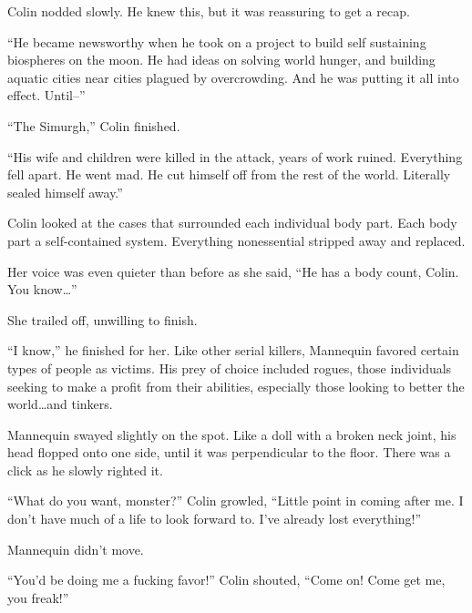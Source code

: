 Colin nodded slowly.  He knew this, but it was reassuring to get a recap.



``He became newsworthy when he took on a project to build self sustaining biospheres on the moon.  He had ideas on solving world hunger, and building aquatic cities near cities plagued by overcrowding.  And he was putting it all into effect.  Until--''



``The Simurgh,'' Colin finished.



``His wife and children were killed in the attack, years of work ruined.  Everything fell apart.  He went mad.  He cut himself off from the rest of the world.  Literally sealed himself away.''



Colin looked at the cases that surrounded each individual body part.  Each body part a self-contained system.  Everything nonessential stripped away and replaced.



Her voice was even quieter than before as she said, ``He has a body count, Colin.  You know\ldots''



She trailed off, unwilling to finish.



``I know,'' he finished for her.  Like other serial killers, Mannequin favored certain types of people as victims.  His prey of choice included rogues, those individuals seeking to make a profit from their abilities, especially those looking to better the world\ldots and tinkers.



Mannequin swayed slightly on the spot.  Like a doll with a broken neck joint, his head flopped onto one side, until it was perpendicular to the floor.  There was a click as he slowly righted it.



``What do you want, monster?''  Colin growled, ``Little point in coming after me.  I don't have much of a life to look forward to.  I've already lost everything!''



Mannequin didn't move.



``You'd be doing me a fucking favor!'' Colin shouted, ``Come on!  Come get me, you freak!''



